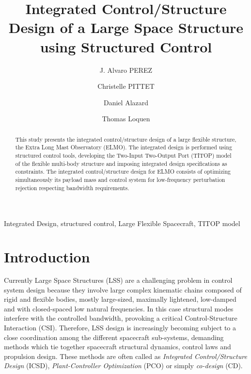 \documentclass{ifacconf}
\begin{document}
\begin{frontmatter}

\title{Integrated Control/Structure Design of a Large Space Structure using Structured  Control} 




\author[First]{J. Alvaro PEREZ} 
\author[Second]{Christelle PITTET} 
\author[Third]{Daniel Alazard} 
\author[Fourth]{Thomas Loquen} 

\address[First]{ONERA System Control Department, 
   Toulouse, 31000 France (e-mail: Jose-Alvaro.Perez\_ Gonzalez@onera.fr)}
   \address[Second]{CNES AOCS Department, 
   Toulouse, 31000 France (e-mail: christelle.pittet@cnes.fr)}
   \address[Third]{ISAE System Control Department, 
   Toulouse, 31000 France (e-mail: daniel.alazard@isae.fr)}
      \address[Fourth]{ONERA System Control Department, 
   Toulouse, 31000 France (e-mail: thomas.loquen@onera.fr)}
\begin{abstract}                \quad This study presents the integrated control/structure design of a large flexible structure, the Extra Long Mast Observatory (ELMO). The integrated design is performed using structured  control tools, developing the Two-Input Two-Output Port (TITOP) model of the flexible multi-body structure and imposing integrated design specifications as  constraints. The integrated control/structure design for ELMO consists of optimizing simultaneously its payload mass and control system for low-frequency perturbation rejection respecting bandwidth requirements.
\end{abstract}

\begin{keyword}
Integrated Design, structured  control, Large Flexible Spacecraft,  TITOP model
\end{keyword}

\end{frontmatter}


\section{Introduction}
Currently Large Space Structures (LSS) are a challenging problem in control system design because they involve large complex kinematic chains composed of rigid and flexible bodies, mostly large-sized, maximally lightened, low-damped and with closed-spaced low natural frequencies. In this case structural modes interfere with the controlled bandwidth, provoking a critical Control-Structure Interaction (CSI). Therefore, LSS design is increasingly becoming subject to a close coordination among the different spacecraft sub-systems, demanding methods which tie together spacecraft structural dynamics, control laws and propulsion design. These methods are often called as \emph{Integrated Control/Structure Design} (ICSD), \emph{Plant-Controller Optimization} (PCO) or simply \emph{co-design} (CD).
\end{document}
